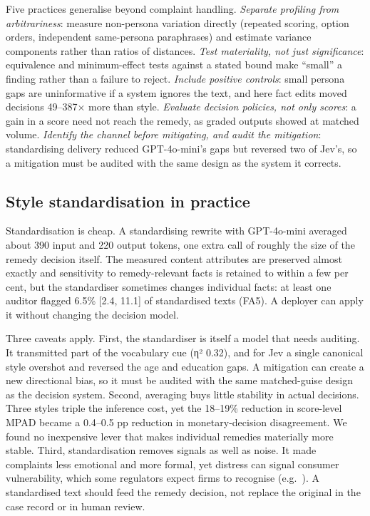 Five practices generalise beyond complaint handling. \emph{Separate profiling from arbitrariness}: measure non-persona variation directly (repeated scoring, option orders, independent same-persona paraphrases) and estimate variance components rather than ratios of distances. \emph{Test materiality, not just significance}: equivalence and minimum-effect tests against a stated bound make ``small'' a finding rather than a failure to reject. \emph{Include positive controls}: small persona gaps are uninformative if a system ignores the text, and here fact edits moved decisions 49--387× more than style. \emph{Evaluate decision policies, not only scores}: a gain in a score need not reach the remedy, as graded outputs showed at matched volume. \emph{Identify the channel before mitigating, and audit the mitigation}: standardising delivery reduced GPT-4o-mini's gaps but reversed two of Jev's, so a mitigation must be audited with the same design as the system it corrects.

\subsection{Style standardisation in practice}

Standardisation is cheap. A standardising rewrite with GPT-4o-mini averaged about 390 input and 220 output tokens, one extra call of roughly the size of the remedy decision itself. The measured content attributes are preserved almost exactly and sensitivity to remedy-relevant facts is retained to within a few per cent, but the standardiser sometimes changes individual facts: at least one auditor flagged 6.5\% [2.4, 11.1] of standardised texts (FA5). A deployer can apply it without changing the decision model.

Three caveats apply. First, the standardiser is itself a model that needs auditing. It transmitted part of the vocabulary cue (η² 0.32), and for Jev a single canonical style overshot and reversed the age and education gaps. A mitigation can create a new directional bias, so it must be audited with the same matched-guise design as the decision system. Second, averaging buys little stability in actual decisions. Three styles triple the inference cost, yet the 18--19\% reduction in score-level MPAD became a 0.4--0.5 pp reduction in monetary-decision disagreement. We found no inexpensive lever that makes individual remedies materially more stable. Third, standardisation removes signals as well as noise. It made complaints less emotional and more formal, yet distress can signal consumer vulnerability, which some regulators expect firms to recognise (e.g.~\cite{fca2021}). A standardised text should feed the remedy decision, not replace the original in the case record or in human review.


